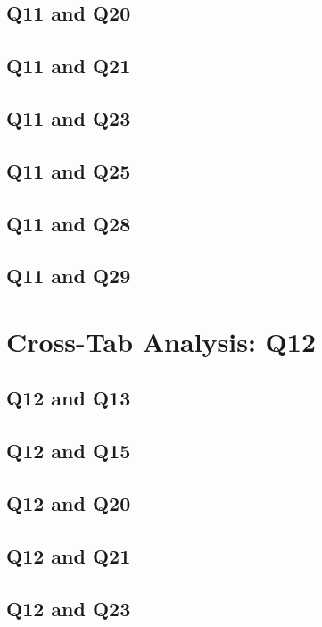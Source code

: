 \documentclass{report}
\begin{document}
\section{Q11 and Q20}\clearpage
\section{Q11 and Q21}\clearpage
\section{Q11 and Q23}\clearpage
\section{Q11 and Q25}\clearpage
\section{Q11 and Q28}\clearpage
\section{Q11 and Q29}\clearpage

\chapter{Cross-Tab Analysis: Q12}

\section{Q12 and Q13}\clearpage
\section{Q12 and Q15}\clearpage
\section{Q12 and Q20}\clearpage
\section{Q12 and Q21}\clearpage
\section{Q12 and Q23}\clearpage
\end{document}
